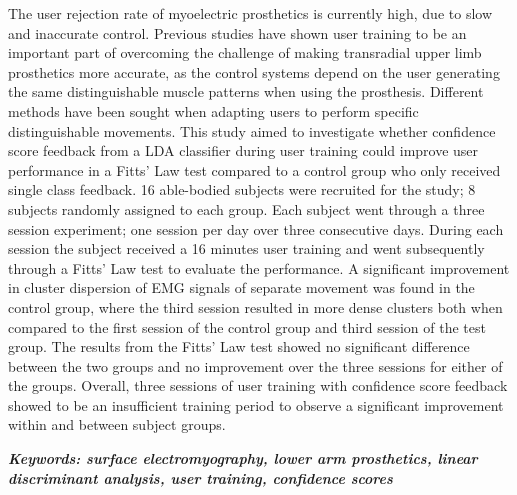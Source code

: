

The user rejection rate of myoelectric prosthetics is currently high, due to slow and inaccurate control. Previous studies have shown user training to be an important part of overcoming the challenge of making transradial upper limb prosthetics more accurate, as the control systems depend on the user generating the same distinguishable muscle patterns when using the prosthesis. Different methods have been sought when adapting users to perform specific distinguishable movements. This study aimed to investigate whether confidence score feedback from a LDA classifier during user training could improve user performance in a Fitts' Law test compared to a control group who only received single class feedback. %
16 able-bodied subjects were recruited for the study; 8 subjects randomly assigned to each group. Each subject went through a three session experiment; one session per day over three consecutive days. During each session the subject received a 16 minutes user training and went subsequently through a Fitts' Law test to evaluate the performance.
A significant improvement in cluster dispersion of EMG signals of separate movement was found in the control group, where the third session resulted in more dense clusters both when compared to the first session of the control group and third session of the test group. The results from the Fitts' Law test showed no significant difference between the two groups and no improvement over the three sessions for either of the groups. Overall, three sessions of user training with confidence score feedback showed to be an insufficient training period to observe a significant improvement within and between subject groups.

\textit{\textbf{Keywords: surface electromyography, lower arm prosthetics, linear discriminant analysis, user training, confidence scores}}